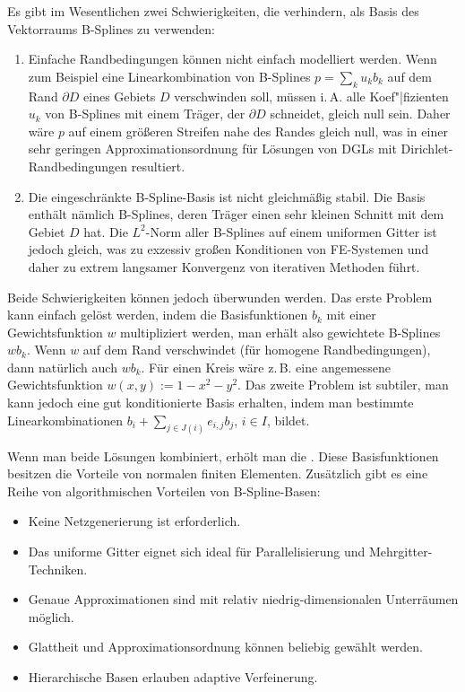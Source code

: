 Es gibt im Wesentlichen zwei Schwierigkeiten, die verhindern, als Basis des Vektorraums B-Splines
zu verwenden:
\begin{enumerate}
    \item
    Einfache Randbedingungen können nicht einfach modelliert werden.
    Wenn zum Beispiel eine Linearkombination von B-Splines $p = \sum_k u_k b_k$ auf dem Rand
    $\partial D$ eines Gebiets $D$ verschwinden soll, müssen i.\,A. alle Koef"|fizienten $u_k$
    von B-Splines mit einem Träger, der $\partial D$ schneidet, gleich null sein.
    Daher wäre $p$ auf einem größeren Streifen nahe des Randes gleich null, was in einer sehr
    geringen Approximationsordnung für Lösungen von DGLs mit Dirichlet-Randbedingungen resultiert.

    \item
    Die eingeschränkte B-Spline-Basis ist nicht gleichmäßig stabil.
    Die Basis enthält nämlich B-Splines, deren Träger einen sehr kleinen Schnitt mit
    dem Gebiet $D$ hat.
    Die $L^2$-Norm aller B-Splines auf einem uniformen Gitter ist jedoch gleich, was zu
    exzessiv großen Konditionen von FE-Systemen und daher zu extrem langsamer Konvergenz von
    iterativen Methoden führt.
\end{enumerate}
Beide Schwierigkeiten können jedoch überwunden werden.
Das erste Problem kann einfach gelöst werden, indem die Basisfunktionen $b_k$ mit einer
Gewichtsfunktion $w$ multipliziert werden, man erhält also gewichtete B-Splines $w b_k$.
Wenn $w$ auf dem Rand verschwindet (für homogene Randbedingungen), dann natürlich auch $w b_k$.
Für einen Kreis wäre z.\,B. eine angemessene Gewichtsfunktion $w(x, y) := 1 - x^2 - y^2$.
Das zweite Problem ist subtiler, man kann jedoch eine gut konditionierte Basis erhalten,
indem man bestimmte Linearkombinationen $b_i + \sum_{j \in J(i)} e_{i,j} b_j$, $i \in I$,
bildet.

Wenn man beide Lösungen kombiniert, erhölt man die
.
Diese Basisfunktionen besitzen die Vorteile von normalen finiten Elementen.
Zusätzlich gibt es eine Reihe von algorithmischen Vorteilen von B-Spline-Basen:
\begin{itemize}
    \item
    Keine Netzgenerierung ist erforderlich.

    \item
    Das uniforme Gitter eignet sich ideal für Parallelisierung und Mehrgitter-Techniken.

    \item
    Genaue Approximationen sind mit relativ niedrig-dimensionalen Unterräumen möglich.

    \item
    Glattheit und Approximationsordnung können beliebig gewählt werden.

    \item
    Hierarchische Basen erlauben adaptive Verfeinerung.
\end{itemize}


